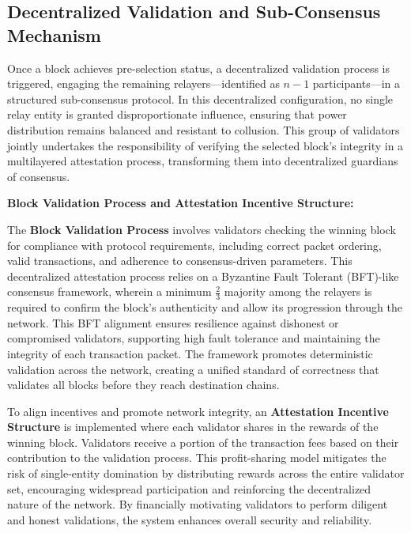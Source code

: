 \documentclass{article}
\begin{document}
\subsection{Decentralized Validation and Sub-Consensus Mechanism}

Once a block achieves pre-selection status, a decentralized validation process is triggered, engaging the remaining relayers---identified as $n - 1$ participants---in a structured sub-consensus protocol. In this decentralized configuration, no single relay entity is granted disproportionate influence, ensuring that power distribution remains balanced and resistant to collusion. This group of validators jointly undertakes the responsibility of verifying the selected block's integrity in a multilayered attestation process, transforming them into decentralized guardians of consensus.

\textbf{Block Validation Process and Attestation Incentive Structure:}

The \textbf{Block Validation Process} involves validators checking the winning block for compliance with protocol requirements, including correct packet ordering, valid transactions, and adherence to consensus-driven parameters. This decentralized attestation process relies on a Byzantine Fault Tolerant (BFT)-like consensus framework, wherein a minimum $\frac{2}{3}$ majority among the relayers is required to confirm the block's authenticity and allow its progression through the network. This BFT alignment ensures resilience against dishonest or compromised validators, supporting high fault tolerance and maintaining the integrity of each transaction packet. The framework promotes deterministic validation across the network, creating a unified standard of correctness that validates all blocks before they reach destination chains.

To align incentives and promote network integrity, an \textbf{Attestation Incentive Structure} is implemented where each validator shares in the rewards of the winning block. Validators receive a portion of the transaction fees based on their contribution to the validation process. This profit-sharing model mitigates the risk of single-entity domination by distributing rewards across the entire validator set, encouraging widespread participation and reinforcing the decentralized nature of the network. By financially motivating validators to perform diligent and honest validations, the system enhances overall security and reliability.
\end{document}

